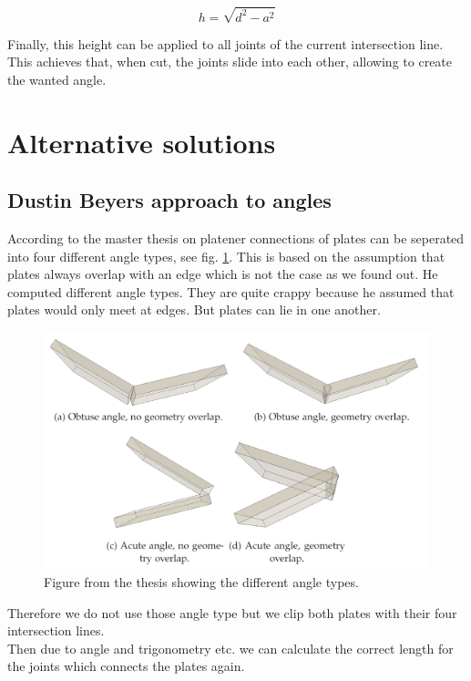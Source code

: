 \documentclass[../ClassicThesis.tex]{subfiles}
\begin{document}
    $$ h = \sqrt{d^2 - a^2} $$
    
    Finally, this height can be applied to all joints of the current intersection line. This achieves that, when cut, the joints slide into each other, allowing to create the wanted angle.
    

\section{Alternative solutions}\label{alternativeSolution}


\subsection{Dustin Beyers\citeauthor{master-thesis} approach to angles}
According to the master thesis on platener \cite{master-thesis} connections of plates can be seperated into four different angle types, see fig. \ref{fig:dustinsAngles}. This is based on the assumption that plates always overlap with an edge which is not the case as we found out.
He computed different angle types. They are quite crappy because he assumed that plates would only meet at edges. But plates can lie in one another.
\begin{figure}[!ht]
    \centering
    \includegraphics[width=1\columnwidth]{Images/06-1-graph-dustinsAngleImage.png}
    \caption{Figure from the thesis \cite{master-thesis} showing the different angle types.}
    \label{fig:dustinsAngles}
\end{figure}
Therefore we do not use those angle type but we clip both plates with their four intersection lines. \\
Then due to angle and trigonometry etc. we can calculate the correct length for the joints which connects the plates again.
\end{document}
